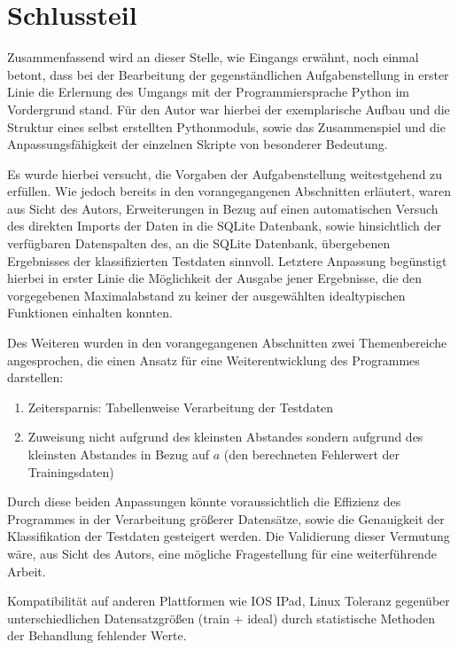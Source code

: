 \chapter{Schlussteil}

Zusammenfassend wird an dieser Stelle, wie Eingangs erwähnt, noch einmal betont, dass bei der Bearbeitung der gegenständlichen Aufgabenstellung in erster Linie die Erlernung des Umgangs mit der Programmiersprache Python im Vordergrund stand. Für den Autor war hierbei der exemplarische Aufbau und die Struktur eines selbst erstellten Pythonmoduls, sowie das Zusammenspiel und die Anpassungsfähigkeit der einzelnen Skripte von besonderer Bedeutung.

Es wurde hierbei versucht, die Vorgaben der Aufgabenstellung weitestgehend zu erfüllen. Wie jedoch bereits in den vorangegangenen Abschnitten erläutert, waren aus Sicht des Autors, Erweiterungen in Bezug auf einen automatischen Versuch des direkten Imports der Daten in die SQLite Datenbank, sowie hinsichtlich der verfügbaren Datenspalten des, an die SQLite Datenbank, übergebenen Ergebnisses der klassifizierten Testdaten sinnvoll. Letztere Anpassung begünstigt hierbei in erster Linie die Möglichkeit der Ausgabe jener Ergebnisse, die den vorgegebenen Maximalabstand zu keiner der ausgewählten idealtypischen Funktionen einhalten konnten.

Des Weiteren wurden in den vorangegangenen Abschnitten zwei Themenbereiche angesprochen, die einen Ansatz für eine Weiterentwicklung des Programmes darstellen:

\begin{enumerate}
 \itemsep0pt
 \item Zeitersparnis: Tabellenweise Verarbeitung der Testdaten
 \item Zuweisung nicht aufgrund des kleinsten Abstandes sondern aufgrund des kleinsten Abstandes in Bezug auf $a$ (den berechneten Fehlerwert der Trainingsdaten)
\end{enumerate}

Durch diese beiden Anpassungen könnte voraussichtlich die Effizienz des Programmes in der Verarbeitung größerer Datensätze, sowie die Genauigkeit der Klassifikation der Testdaten gesteigert werden. Die Validierung dieser Vermutung wäre, aus Sicht des Autors, eine mögliche Fragestellung für eine weiterführende Arbeit. 

Kompatibilität \cite{dunn_getting_2017-1}auf anderen Plattformen wie IOS IPad, Linux   
Toleranz gegenüber unterschiedlichen Datensatzgrößen (train + ideal) durch statistische Methoden der Behandlung fehlender Werte.

